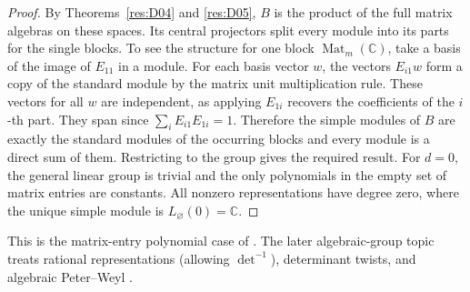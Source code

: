 \begin{proof}
By Theorems~\ref{res:D04} and \ref{res:D05}, \(B\) is the
product of the full matrix algebras on these spaces. Its
central projectors split every module into its parts for the
single blocks. To see the structure for one block
\(\operatorname{Mat}_{m}(\mathbb C)\), take a basis of the image
of \(E_{11}\) in a module. For each basis vector \(w\), the
vectors \(E_{i1}w\) form a copy of the standard module by the
matrix unit multiplication rule. These vectors for all \(w\)
are independent, as applying \(E_{1i}\) recovers the
coefficients of the \(i\)-th part. They span since
\(\sum_i E_{i1}E_{1i}=1\). Therefore the simple modules of \(B\)
are exactly the standard modules of the occurring blocks and
every module is a direct sum of them. Restricting to the group
gives the required result. For \(d=0\), the general linear
group is trivial and the only polynomials in the empty set of
matrix entries are constants. All nonzero representations
have degree zero, where the unique simple module is
\(L_{\varnothing}(0)=\mathbb C\).
\end{proof}

This is the matrix-entry polynomial case of
\cite[Theorem 4.66(i)]{etingof}. The later algebraic-group topic
treats rational representations (allowing \(\det^{-1}\)),
determinant twists, and algebraic Peter--Weyl
\cite[Theorem 4.66(ii)]{etingof}.
